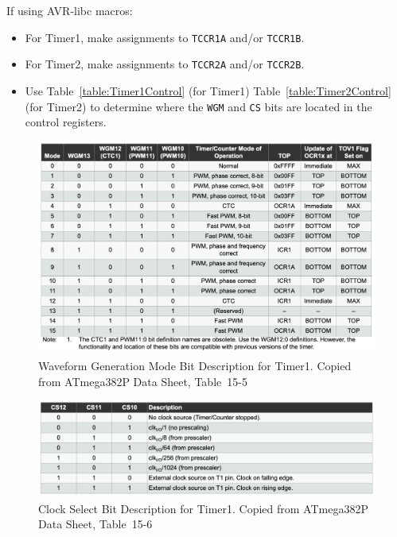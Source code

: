 If using AVR-libc macros:
\begin{itemize}
\item For Timer1, make assignments to \lstinline{TCCR1A} and/or
    \lstinline{TCCR1B}.
\item For Timer2, make assignments to \lstinline{TCCR2A} and/or
    \lstinline{TCCR2B}.
\item Use Table~\ref{table:Timer1Control} (for Timer1)
    Table~\ref{table:Timer2Control} (for Timer2) to determine where the
    \texttt{WGM} and \texttt{CS} bits are located in the control registers.
\end{itemize}

\begin{figure}
    \centering
    \includegraphics[width=15cm]{WGM-Timer1}
    \caption{Waveform Generation Mode Bit Description for Timer1. \tiny Copied from ATmega382P Data Sheet, Table~15-5 \label{fig:Timer1WGM}}
\end{figure}

\begin{figure}
    \centering
    \includegraphics[width=15cm]{CS-Timer1}
    \caption{Clock Select Bit Description for Timer1. \tiny Copied from ATmega382P Data Sheet, Table~15-6 \label{fig:Timer1CS}}
\end{figure}

